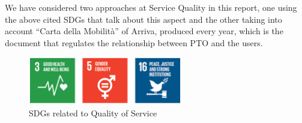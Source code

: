 We have considered two approaches at Service Quality in this report, one using the above cited SDGs that talk about this aspect and the other taking into account “Carta della Mobilità” of Arriva, produced every year, which is the document that regulates the relationship between PTO and the users.

\begin{figure}[h!]
    \centering
    \includegraphics[width=0.6\textwidth]{Images/Social_sustainability/SDG service quality.PNG}
    \caption{SDGs related to Quality of Service}
    \label{fig:SDGqualiserv}
\end{figure}

